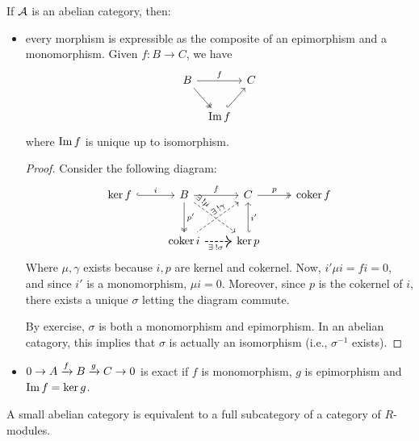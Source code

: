 \begin{fact} If $\mathcal{A}$ is an abelian category, then:
  \begin{itemize}
    \item every morphism is expressible as the composite of an epimorphism
      and a monomorphism. Given $f: B \to C$, we have
      \[
        \begin{tikzcd}[column sep=tiny]
          B \ar[rr, "f"] \ar[rd, twoheadrightarrow] & & C \\
               & \Image f \ar[ru, hook] &
        \end{tikzcd}
      \]
      where $\operatorname{Im} f$ is unique up to isomorphism.

      \begin{proof}
        Consider the following diagram:
        \[
          \begin{tikzcd}[row sep=25pt]
            \ker f \ar[r, "i", hookrightarrow] &
            B \ar[r, "f"] \ar[d, "p'", twoheadrightarrow]
            \ar[rd, "\exists ! \mu", dashed, very near start, sloped] &
            C \ar[r, "p", twoheadrightarrow] \ar[d, "i'", hookleftarrow]
            \ar[ld, "\exists ! \gamma", dashed, leftarrow, pos=0.4, sloped] &
            \coker{f} \\
            & \coker{i} \ar[r, "\exists ! \sigma"', dashed, thick, pos=0.4] &
            \ker{p} &
          \end{tikzcd}
        \]
        Where $\mu, \gamma$ exists because $i, p$ are kernel and cokernel.
        Now, $i' \mu i = f i = 0$, and since $i'$ is a monomorphism,
        $\mu i = 0$. Moreover, since $p$ is the cokernel of $i$,
        there exists a unique $\sigma$ letting the diagram commute.

        By exercise, $\sigma$ is both a monomorphism and epimorphism.
        In an abelian catagory, this implies that $\sigma$ is
        actually an isomorphism (i.e., $\sigma^{-1}$ exists).
      \end{proof}
    \item $0 \to A \xrightarrow{f} B \xrightarrow{g} C \to 0$ is exact if
      $f$ is monomorphism, $g$ is epimorphism and $\operatorname{Im} f = \ker g$.
  \end{itemize}
\end{fact}

\begin{theorem}
  A small abelian category is equivalent to a full subcategory of a category
  of $R$-modules.
\end{theorem}

